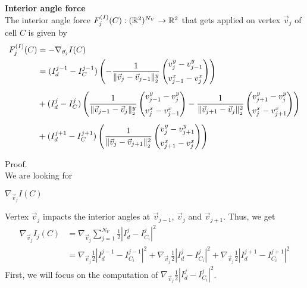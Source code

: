 \begin{proposition} \textbf{Interior angle force} \\

	The interior angle force $F^{(I)}_j(C): (\mathbb{R}^2)^{N_V} \rightarrow \mathbb{R}^2$ that gets applied on vertex $\vec{v}_j$ of cell $C$ is given by 
	\begin{align}
		\begin{split}
			F^{(I)}_j(C) &= - \nabla_{\vec{v}_j} I(C)  \\
				&= (I^{j-1}_d - I^{j-1}_{C}) \left( 
					- \frac{1}{\norm[\vec{v}_{j} - \vec{v}_{j-1}]^{y}} \begin{pmatrix}
						v_{j}^{y} - v_{j-1}^{y} \\[0.5em]
						v_{j-1}^{x} - v_{j}^{x}
					\end{pmatrix} 
				\right) \\[0.5em] 
			&+ (I^{j}_d - I^{j}_{C}) \left( 
				\frac{1}{\norm[\vec{v}_{j-1} - \vec{v}_j]^{y}} \begin{pmatrix}
				v_{j-1}^{y} - v_{j}^{y} \\[0.5em]
				v_{j}^{x} - v_{j-1}^{x}
				\end{pmatrix} 
				- \frac{1}{\norm[\vec{v}_{j+1} - \vec{v}_j]^2} \begin{pmatrix}
				v_{j+1}^{y} - v_{j}^{y} \\[0.5em]
				v_{j}^{x} - v_{j+1}^{x}
				\end{pmatrix} 
				\right) \\[0.5em] 
			&+ (I^{j+1}_d - I^{j+1}_{C}) \left( 
				\frac{1}{\norm[\vec{v}_{j} - \vec{v}_{j+1}]^2} \begin{pmatrix}
				v_{j}^{y} - v_{j+1}^{y} \\[0.5em]
				v_{j+1}^{x} - v_{j}^{x}
				\end{pmatrix} 
				\right) %
		\end{split}
	\end{align}


	Proof. \\
	We are looking for 
	\begin{center}
		$
		\nabla_{\vec{v}_j} I(C)
		$
	\end{center}
	
	Vertex $\vec{v}_j$ impacts the interior angles at $\vec{v}_{j-1}$, $\vec{v}_j$ and $\vec{v}_{j+1}$. 
	Thus, we get 
	\begin{align*}
		\nabla_{\vec{v}_j}  I_{j}(C) &=  \nabla_{\vec{v}_j} \sum\limits_{j=1}^{N_V} \frac{1}{2}| I^{j}_d - I^j_{C_i} |^2 \\
		&= \nabla_{\vec{v}_j} \frac{1}{2}| I^{j-1}_d - I^{j-1}_{C_i} |^2 
		+ \nabla_{\vec{v}_j} \frac{1}{2}| I^{j}_d - I^{j}_{C_i} |^2 
		+ \nabla_{\vec{v}_j} \frac{1}{2}| I^{j+1}_d - I^{j+1}_{C_i} |^2
	\end{align*}
	First, we will focus on the computation of $\nabla_{\vec{v}_j} \frac{1}{2}| I^{j}_d - I^{j}_{C_i} |^2$. 


\end{proposition}
